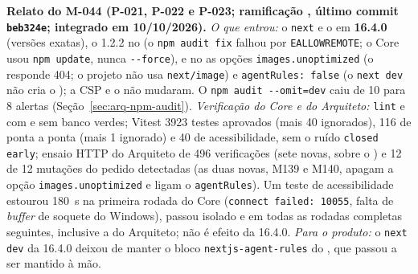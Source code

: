 \noindent{}\quad \textbf{Relato do M-044 (P-021, P-022 e P-023; ramificação , último commit \texttt{beb324e}; integrado em 10/10/2026).} \emph{O que entrou:} o \texttt{next} e o  em \textbf{16.4.0} (versões exatas), o  1.2.2 no  (o \texttt{npm audit fix} falhou por \texttt{EALLOWREMOTE}; o Core usou \texttt{npm update}, nunca \texttt{-{}-force}), e no  as opções \texttt{images.unoptimized} (o  responde 404; o projeto não usa \texttt{next/image}) e \texttt{agentRules: false} (o \texttt{next dev} não cria o ); a CSP e o  não mudaram. O \texttt{npm audit -{}-omit=dev} caiu de 10 para 8 alertas (Seção~\ref{sec:arq-npm-audit}). \emph{Verificação do Core e do Arquiteto:} \texttt{lint} e  com e sem banco verdes; Vitest 3923 testes aprovados (mais 40 ignorados), 116 de ponta a ponta (mais 1 ignorado) e 40 de acessibilidade, sem o ruído \texttt{closed early}; ensaio HTTP do Arquiteto de 496 verificações (sete novas, sobre o ) e 12 de 12 mutações do pedido detectadas (as duas novas, M139 e M140, apagam a opção \texttt{images.unoptimized} e ligam o \texttt{agentRules}). Um teste de acessibilidade estourou 180~s na primeira rodada do Core (\texttt{connect failed: 10055}, falta de \emph{buffer} de soquete do Windows), passou isolado e em todas as rodadas completas seguintes, inclusive a do Arquiteto; não é efeito da 16.4.0. \emph{Para o produto:} o \texttt{next dev} da 16.4.0 deixou de manter o bloco \texttt{nextjs-agent-rules} do , que passou a ser mantido à mão.

